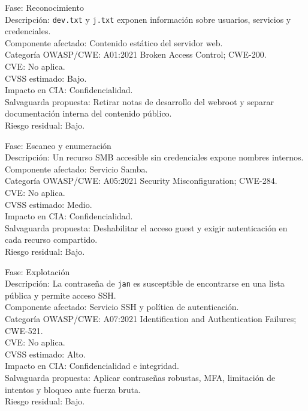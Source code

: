 \documentclass[11pt,a4paper]{article}
\begin{document}
\begin{campo}
Fase: Reconocimiento\\
Descripción: \texttt{dev.txt} y \texttt{j.txt} exponen información sobre usuarios, servicios y credenciales.\\
Componente afectado: Contenido estático del servidor web.\\
Categoría OWASP/CWE: A01:2021 Broken Access Control; CWE-200.\\
CVE: No aplica.\\
CVSS estimado: Bajo.\\
Impacto en CIA: Confidencialidad.\\
Salvaguarda propuesta: Retirar notas de desarrollo del webroot y separar documentación interna del contenido público.\\
Riesgo residual: Bajo.
\end{campo}

\begin{campo}
Fase: Escaneo y enumeración\\
Descripción: Un recurso SMB accesible sin credenciales expone nombres internos.\\
Componente afectado: Servicio Samba.\\
Categoría OWASP/CWE: A05:2021 Security Misconfiguration; CWE-284.\\
CVE: No aplica.\\
CVSS estimado: Medio.\\
Impacto en CIA: Confidencialidad.\\
Salvaguarda propuesta: Deshabilitar el acceso guest y exigir autenticación en cada recurso compartido.\\
Riesgo residual: Bajo.
\end{campo}

\begin{campo}
Fase: Explotación\\
Descripción: La contraseña de \texttt{jan} es susceptible de encontrarse en una lista pública y permite acceso SSH.\\
Componente afectado: Servicio SSH y política de autenticación.\\
Categoría OWASP/CWE: A07:2021 Identification and Authentication Failures; CWE-521.\\
CVE: No aplica.\\
CVSS estimado: Alto.\\
Impacto en CIA: Confidencialidad e integridad.\\
Salvaguarda propuesta: Aplicar contraseñas robustas, MFA, limitación de intentos y bloqueo ante fuerza bruta.\\
Riesgo residual: Bajo.
\end{campo}
\end{document}
